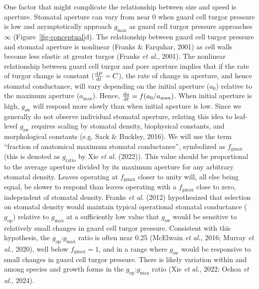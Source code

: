 \documentclass[
  letterpaper,
  DIV=11,
  numbers=noendperiod]{scrartcl}
\newcommand{\fgmax}{$f_\mathrm{gmax}$}
\newcommand{\gmax}{$g_\mathrm{max}$}
\newcommand{\gop}{$g_\mathrm{op}$}
\newcommand{\gsw}{$g_\mathrm{sw}$}
\begin{document}
One factor that might complicate the relationship between size and speed
is aperture. Stomatal aperture can vary from near 0 when guard cell
turgor pressure is low and asymptotically approach \gmax{} as guard cell
turgor pressure approaches \(\infty\) (Figure~\ref{fig-conceptual}d).
The relationship between guard cell turgor pressure and stomatal
aperture is nonlinear (Franks \& Farquhar, 2001) as cell walls become
less elastic at greater turgor (Franks \emph{et al.}, 2001). The
nonlinear relationship between guard cell turgor and pore aperture
implies that if the rate of turgor change is constant
(\(\dv{P}{t} = C\)), the rate of change in aperture, and hence stomatal
conductance, will vary depending on the initial aperture (\(a_0\))
relative to the maximum aperture (\(a_\mathrm{max}\)). Hence,
\(\dv{a}{t} = f(a_0 / a_\mathrm{max})\). When initial aperture is high,
\gsw{} will respond more slowly than when initial aperture is low. Since
we generally do not observe individual stomatal aperture, relating this
idea to leaf-level \gsw{} requires scaling by stomatal density,
biophysical constants, and morphological constants (e.g. Sack \&
Buckley, 2016). We will use the term ``fraction of anatomical maximum
stomatal conductance'', symbolized as \fgmax{} (this is denoted as
\(g_\mathrm{ratio}\) by Xie \emph{et al.} (2022)). This value should be
proportional to the average aperture divided by its maximum aperture for
any arbitrary stomatal density. Leaves operating at \fgmax{} closer to
unity will, all else being equal, be slower to respond than leaves
operating with a \fgmax{} close to zero, independent of stomatal
density. Franks \emph{et al.} (2012) hypothesized that selection on
stomatal density would maintain typical operational stomatal conductance
(\gop) relative to \gmax{} at a sufficiently low value that \gsw{} would
be sensitive to relatively small changes in guard cell turgor pressure.
Consistent with this hypothesis, the \gop:\gmax{} ratio is often near
0.25 (McElwain \emph{et al.}, 2016; Murray \emph{et al.}, 2020), well
below \(f_\mathrm{gmax} = 1\), and in a range where \gsw{} would be
responsive to small changes in guard cell turgor pressure. There is
likely variation within and among species and growth forms in the
\gop:\gmax{} ratio (Xie \emph{et al.}, 2022; Ochoa \emph{et al.}, 2024).
\end{document}
